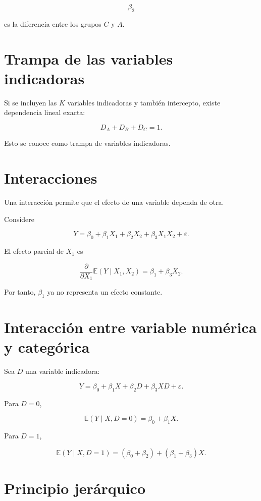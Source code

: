 \documentclass[
  spanish,
  11pt,
  letterpaper,
  DIV=11,
  numbers=noendperiod]{scrreprt}
\theoremstyle{definition}
\theoremstyle{plain}
\theoremstyle{definition}
\theoremstyle{remark}
\begin{document}
\[
\beta_2
\]

es la diferencia entre los grupos \(C\) y \(A\).

\section{Trampa de las variables
indicadoras}\label{trampa-de-las-variables-indicadoras}

Si se incluyen las \(K\) variables indicadoras y también intercepto,
existe dependencia lineal exacta:

\[
D_A+D_B+D_C=1.
\]

Esto se conoce como trampa de variables indicadoras.

\section{Interacciones}\label{interacciones}

Una interacción permite que el efecto de una variable dependa de otra.

Considere

\[
Y
=
\beta_0
+
\beta_1X_1
+
\beta_2X_2
+
\beta_3X_1X_2
+
\varepsilon.
\]

El efecto parcial de \(X_1\) es

\[
\frac{\partial}{\partial X_1}
\mathbb{E}(Y\mid X_1,X_2)
=
\beta_1+\beta_3X_2.
\]

Por tanto, \(\beta_1\) ya no representa un efecto constante.

\section{Interacción entre variable numérica y
categórica}\label{interacciuxf3n-entre-variable-numuxe9rica-y-categuxf3rica}

Sea \(D\) una variable indicadora:

\[
Y
=
\beta_0
+
\beta_1X
+
\beta_2D
+
\beta_3XD
+
\varepsilon.
\]

Para \(D=0\),

\[
\mathbb{E}(Y\mid X,D=0)
=
\beta_0+\beta_1X.
\]

Para \(D=1\),

\[
\mathbb{E}(Y\mid X,D=1)
=
(\beta_0+\beta_2)
+
(\beta_1+\beta_3)X.
\]

\section{Principio jerárquico}\label{principio-jeruxe1rquico}
\end{document}
